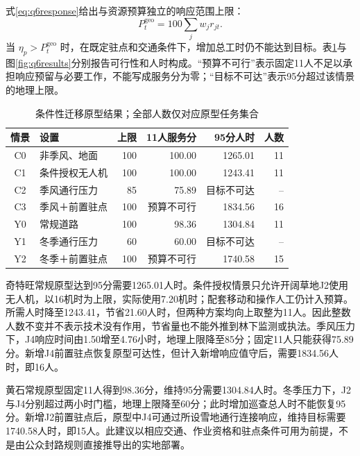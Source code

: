 \documentclass[UTF8,fontset=fandol,12pt,a4paper]{ctexart}
\begin{document}
式\eqref{eq:q6response}给出与资源预算独立的响应范围上限：
\begin{equation}
P_t^{\mathrm{geo}}=100\sum_jw_jr_{jt}.
\label{eq:q6cap}
\end{equation}
当 \(\eta_p>P_t^{\mathrm{geo}}\) 时，在既定驻点和交通条件下，增加总工时仍不能达到目标。表\ref{tab:q6results}与图\ref{fig:q6results}分别报告可行性和人时构成。“预算不可行”表示固定11人不足以承担响应预留与必要工作，不能写成服务分为零；“目标不可达”表示95分超过该情景的地理上限。

\begin{table}[htbp]
\centering
\caption{条件性迁移原型结果；全部人数仅对应原型任务集合}
\label{tab:q6results}
\begin{tabularx}{\linewidth}{cXrrrr}
\toprule
情景 & 设置 & 上限 & 11人服务分 & 95分人时 & 人数\\
\midrule
C0 & 非季风、地面 & 100 & 100.00 & 1265.01 & 11\\
C1 & 条件授权无人机 & 100 & 100.00 & 1243.41 & 11\\
C2 & 季风通行压力 & 85 & 75.89 & 目标不可达 & --\\
C3 & 季风＋前置驻点 & 100 & 预算不可行 & 1834.56 & 16\\
Y0 & 常规道路 & 100 & 98.36 & 1304.84 & 11\\
Y1 & 冬季通行压力 & 60 & 60.00 & 目标不可达 & --\\
Y2 & 冬季＋前置驻点 & 100 & 预算不可行 & 1740.58 & 15\\
\bottomrule
\end{tabularx}
\end{table}

奇特旺常规原型达到95分需要1265.01人时。条件授权情景只允许开阔草地J2使用无人机，以16机时为上限，实际使用7.20机时；配套移动和操作人工仍计入预算。所需人时降至1243.41，节省21.60人时，但两种方案均向上取整为11人。因此整数人数不变并不表示技术没有作用，节省量也不能外推到林下监测或执法。季风压力下，J4响应时间由1.50增至4.76小时，地理上限降至85分；固定11人只能获得75.89分。新增J4前置驻点恢复原型可达性，但计入新增响应值守后，需要1834.56人时，即16人。

黄石常规原型固定11人得到98.36分，维持95分需要1304.84人时。冬季压力下，J2与J4分别超过两小时门槛，地理上限降至60分；此时增加巡查总人时不能恢复95分。新增J2前置驻点后，原型中J4可通过所设雪地通行连接响应，维持目标需要1740.58人时，即15人。此建议以相应交通、作业资格和驻点条件可用为前提，不是由公众封路规则直接推导出的实地部署。
\end{document}
